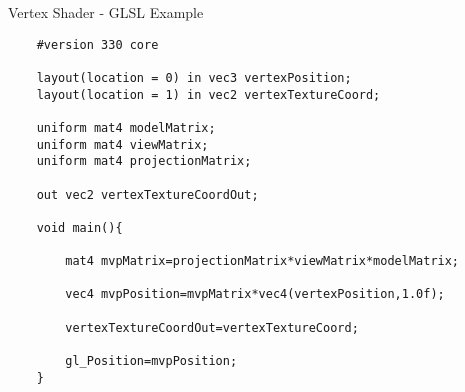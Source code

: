 \begin{frame}[fragile]{Vertex Shader - GLSL Example}
	\begin{lstlisting}
	#version 330 core
	
	layout(location = 0) in vec3 vertexPosition;
	layout(location = 1) in vec2 vertexTextureCoord;
	
	uniform mat4 modelMatrix;
	uniform mat4 viewMatrix;
	uniform mat4 projectionMatrix;
	
	out vec2 vertexTextureCoordOut;
	
	void main(){
	
		mat4 mvpMatrix=projectionMatrix*viewMatrix*modelMatrix;
		
		vec4 mvpPosition=mvpMatrix*vec4(vertexPosition,1.0f);
		
		vertexTextureCoordOut=vertexTextureCoord;
		
		gl_Position=mvpPosition;
	}
	\end{lstlisting}
\end{frame}